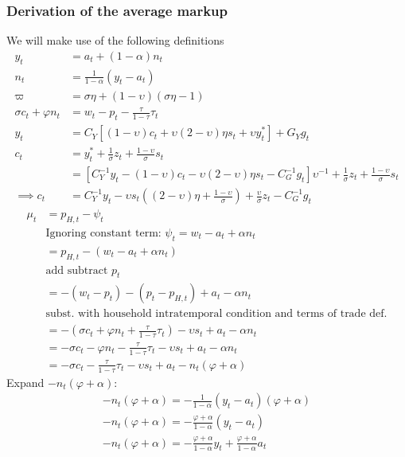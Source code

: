 \subsubsection*{Derivation of the average markup}
\tiny
We will make use of the following definitions
\begin{align}\label{eq:appendix_average_markup_beginning}
    y_t &= a_t + (1-\alpha)n_t\\
    n_t &= \frac{1}{1-\alpha}(y_t - a_t)\\
    \varpi &= \sigma \eta + (1-\upsilon)(\sigma \eta - 1)\\
    \sigma c_t + \varphi n_t &= w_t - p_t - \frac{\tau}{1-\tau}\tau_t\\
    y_t &= C_Y\left[(1-\upsilon)c_t + \upsilon (2-\upsilon)\eta s_t + \upsilon y^*_t\right] + G_Y g_t\\
    c_t &= y_t^* + \frac{1}{\sigma}z_t + \frac{1-\upsilon}{\sigma}s_t\\
    &= \left[C_Y^{-1} y_t -(1-\upsilon)c_t - \upsilon(2-\upsilon)\eta s_t - C^{-1}_G g_t \right]\upsilon^{-1} + \frac{1}{\sigma}z_t + \frac{1-\upsilon}{\sigma}s_t\\
    \implies c_t &= C_Y^{-1} y_t - \upsilon s_t \left( (2-\upsilon)\eta + \frac{1-\upsilon}{\sigma}\right) + \frac{\upsilon}{\sigma}z_t - C_G^{-1} g_t
\end{align}
\begin{align}
    \mu_t &= p_{H,t} - \psi_t \\ 
    &\text{Ignoring constant term: $\psi_t = w_t - a_t + \alpha n_t$} \nonumber\\
    &= p_{H,t} - (w_t - a_t + \alpha n_t)\\
    &\text{add subtract $p_t$} \nonumber\\
    &=-(w_t-p_t) - (p_t - p_{H,t}) + a_t - \alpha n_t \label{eq:appendix_average_markup_add_subtract_p}\\
    &\text{subst. with household intratemporal condition and terms of trade def.} \nonumber\\
    &= -(\sigma c_t + \varphi n_t + \frac{\tau}{1-\tau}\tau_t) - \upsilon s_t + a_t - \alpha n_t\\
    &= -\sigma c_t - \varphi n_t - \frac{\tau}{1-\tau}\tau_t - \upsilon s_t + a_t - \alpha n_t\\
    &= -\sigma c_t - \frac{\tau}{1-\tau}\tau_t - \upsilon s_t + a_t - n_t(\varphi + \alpha)
\end{align}
Expand $-n_t(\varphi + \alpha)$:
\begin{align}
    -n_t(\varphi + \alpha) = -\frac{1}{1-\alpha}(y_t - a_t)(\varphi + \alpha)\\
    -n_t(\varphi + \alpha) = -\frac{\varphi + \alpha}{1-\alpha}(y_t - a_t)\\
    -n_t(\varphi + \alpha) = -\frac{\varphi + \alpha}{1-\alpha}y_t + \frac{\varphi + \alpha}{1-\alpha}a_t
\end{align}
